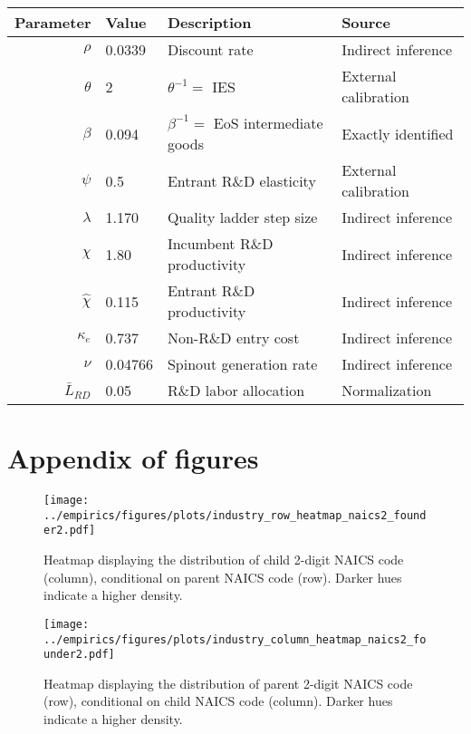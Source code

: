 \documentclass[11pt,english]{article}
\begin{document}
\begin{table}[!htb]
	\centering
	\label{calibration_2_parameters}
	\begin{tabular}{rlll}
		\toprule \toprule
		Parameter & Value & Description & Source \tabularnewline
		\midrule
		$\rho$ & 0.0339 & Discount rate  & Indirect inference \tabularnewline
		$\theta$ & 2 & $\theta^{-1} = $ IES & External calibration 
		\tabularnewline
		$\beta$ & 0.094 & $\beta^{-1} = $ EoS intermediate goods & Exactly identified \tabularnewline 
		$\psi$ & 0.5 & Entrant R\&D elasticity & External calibration \tabularnewline
		$\lambda$ & 1.170 & Quality ladder step size & Indirect inference 
		\tabularnewline
		$\chi$ & 1.80 & Incumbent R\&D productivity & Indirect inference 
		\tabularnewline
		$\hat{\chi}$ & 0.115 & Entrant R\&D productivity & Indirect inference \tabularnewline 
		$\kappa_e$ & 0.737 & Non-R\&D entry cost & Indirect inference \tabularnewline
		$\nu$ & 0.04766 & Spinout generation rate  & Indirect inference\tabularnewline
		$\bar{L}_{RD}$ & 0.05 & R\&D labor allocation  & Normalization \tabularnewline
		\bottomrule
	\end{tabular}
\end{table}



\newpage
\section{Appendix of figures}

\setcounter{figure}{0}
\renewcommand{\thefigure}{\Alph{section}\arabic{figure}}

\begin{figure}[!htb]
	\centering
	\texttt{[image: ../empirics/figures/plots/industry\_row\_heatmap\_naics2\_founder2.pdf]}
	\caption{Heatmap displaying the distribution of child 2-digit NAICS code (column), conditional on parent NAICS code (row). Darker hues indicate a higher density.}
	\label{figure:industry_row_heatmap_naics2_founder2}
\end{figure}

\begin{figure}[!htb]
	\centering
	\texttt{[image: ../empirics/figures/plots/industry\_column\_heatmap\_naics2\_founder2.pdf]}
	\caption{Heatmap displaying the distribution of parent 2-digit NAICS code (row), conditional on child NAICS code (column). Darker hues indicate a higher density.}
	\label{figure:industry_column_heatmap_naics2_founder2}
\end{figure}
\end{document}
